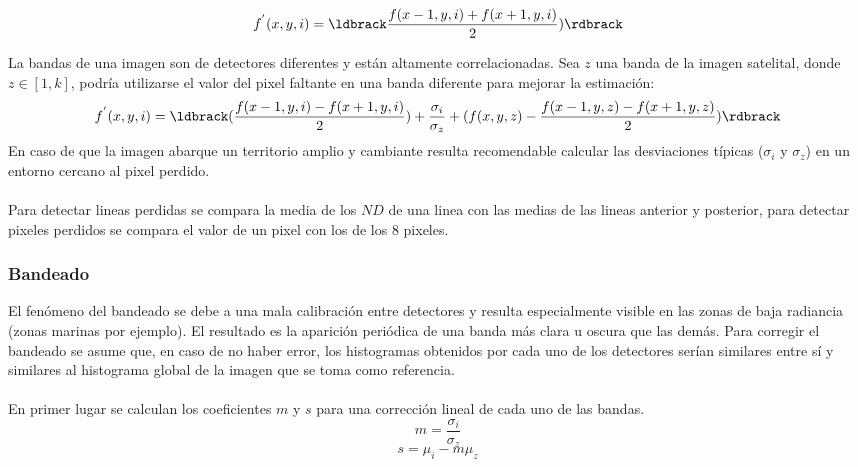 		\begin{equation}
		f^{'}(x,y,i) = \ldbrack \dfrac{f(x-1,y,i) + f(x+1,y,i)}{2}) \rdbrack
		\end{equation} 

La bandas de una imagen son de detectores diferentes y est\'an altamente correlacionadas. Sea  $ z $ una banda de la imagen satelital, donde $ z \in [1,k] $, podr\'ia utilizarse el valor del pixel faltante en una banda diferente para mejorar la estimaci\'on:
		\begin{equation}
		f^{'}(x,y,i) = \ldbrack (\dfrac{f(x-1,y,i)-f(x+1,y,i)}{2})+ \dfrac{\sigma_{i}}{\sigma_{z}} +(f(x,y,z)-\dfrac{f(x-1,y,z)-f(x+1,y,z)}{2}) \rdbrack
		\end{equation} 
En caso de que la imagen abarque un territorio amplio y cambiante resulta recomendable calcular las desviaciones t\'ipicas ($ \sigma_{i} $ y $ \sigma_{z} $) en un entorno cercano al pixel perdido.\\~\\
Para detectar lineas perdidas se compara la media de los $ ND $ de una linea con las medias de las lineas anterior y posterior, para detectar pixeles perdidos se compara el valor de un pixel con los de los 8 pixeles.
\subsubsection{Bandeado}\label{subsec:bandeado}
El fen\'omeno del bandeado se debe a una mala calibraci\'on entre detectores y resulta especialmente visible en las zonas de baja radiancia (zonas marinas por ejemplo). El resultado es la aparici\'on peri\'odica de una banda m\'as clara u oscura que las dem\'as.
Para corregir el bandeado se asume que, en caso de no haber error, los histogramas obtenidos por cada uno de los detectores ser\'ian similares entre s\'i y similares al histograma global de la imagen que se toma como referencia.\\~\\
En primer lugar se calculan los coeficientes $ m $ y $ s $ para una correcci\'on lineal de cada uno de las bandas.
		\begin{equation}
		m =\dfrac{\sigma_{i}}{\sigma_{z}}
		\end{equation} 	
				\begin{equation}
				s=\mu_{i} - m\mu_{z}
				\end{equation} 	
				

